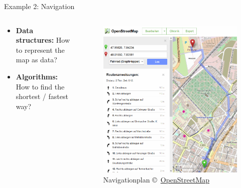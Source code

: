 \begin{frame}{Example 2: Navigation}
  \begin{columns}
    \begin{column}{0.55\textwidth}
      \begin{itemize}
        \item<2-|handout:1>
          \textbf{Data structures:} How to represent the map as data?
        \item<3-|handout:1>
          \textbf{Algorithms:} How to find the shortest / fastest way?
      \end{itemize}
    \end{column}%
    \begin{column}{0.45\textwidth}
      \begin{figure}[!h]
        \includegraphics[width=\textwidth]
          {Images/Introduction/OpenStreetmap.png}
        \caption{Navigationplan \copyright\,%
          \href{http://openstreetmap.org/}{OpenStreetMap}%
        }%
        \label{fig:openstreetmap}
      \end{figure}
    \end{column}
  \end{columns}
\end{frame}
